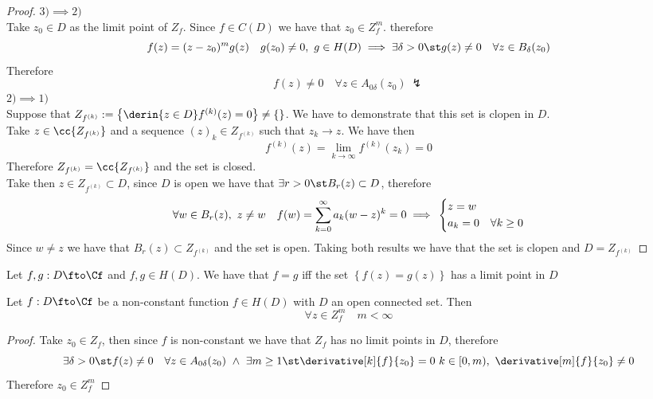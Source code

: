 \documentclass[../mmf.tex]{subfiles}
\begin{document}
\begin{proof}
	$3)\implies{} 2)$\\
	Take $z_0\in D$ as the limit point of $Z_f$. Since $f\in C(D)$ we have that $z_0\in Z_f^m$. therefore
	\begin{equation*}
		f(z)=(z-z_0)^mg(z)\quad g(z_0)\ne0,\ g\in H(D)\implies{}\exists\delta>0\st g(z)\ne0\quad\forall z\in B_\delta(z_0)
	\end{equation*}
	Therefore
	\begin{equation*}
		f(z)\ne0\quad\forall z\in A_{0\delta}(z_0)\ \lightning
	\end{equation*}
	$2)\implies{}1)$\\
	Suppose that $Z_{f^{(k)}}:=\left\{ \derin{z\in D}f^{(k)}(z)=0 \right\}\ne\{\}$. We have to demonstrate that this set is clopen in $D$.\\
	Take $z\in\cc{Z_{f^{(k)}}}$ and a sequence $(z)_k\in Z_{f^{(k)}}$ such that $z_k\to z$. We have then
	\begin{equation*}
		f^{(k)}(z)=\lim_{k\to\infty}f^{(k)}(z_k)=0
	\end{equation*}
	Therefore $Z_{f^{(k)}}=\cc{Z_{f^{(k)}}}$ and the set is closed.\\
	Take then $z\in Z_{f^{(k)}}\subset D$, since $D$ is open we have that $\exists r>0\st B_r(z)\subset D$, therefore
	\begin{equation*}
		\forall w\in B_r(z),\ z\ne w\quad f(w)=\sum_{k=0}^\infty a_k(w-z)^k=0\implies{}\begin{dcases}z=w\\a_k=0&\forall k\ge0\end{dcases}
	\end{equation*}
	Since $w\ne z$ we have that $B_r(z)\subset Z_{f^{(k)}}$ and the set is open. Taking both results we have that the set is clopen and $D=Z_{f^{(k)}}$
\end{proof}
\begin{cor}
	Let $f,g:D\fto\Cf$ and $f,g\in  H(D)$. We have that $f=g$ iff the set $\left\{ f(z)=g(z) \right\}$ has a limit point in $D$
\end{cor}
\begin{cor}
	Let $f:D\fto\Cf$ be a non-constant function $f\in H(D)$ with $D$ an open connected set. Then
	\begin{equation*}
		\forall z\in Z_f^m\quad m<\infty
	\end{equation*}
\end{cor}
\begin{proof}
	Take $z_0\in Z_f$, then since $f$ is non-constant we have that $Z_f$ has no limit points in $D$, therefore
	\begin{equation*}
		\exists\delta>0\st f(z)\ne0\quad\forall z\in A_{0\delta}(z_0)\ \wedge\ \exists m\ge1\st\derivative[k]{f}{z_0}=0\ k\in[0,m),\ \derivative[m]{f}{z_0}\ne0
	\end{equation*}
	Therefore $z_0\in Z_f^m$
\end{proof}
\end{document}

